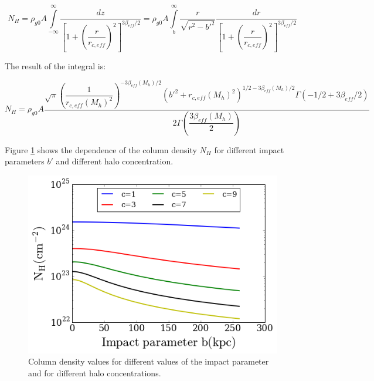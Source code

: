 \documentclass[12pt]{article}
\begin{document}
\begin{equation}
N_{H} = \rho_{g0}A \int \limits_{-\infty}^{\infty} \dfrac{dz}{\left
[ 1 + \left(\dfrac{r}{r_{c,eff}} \right)^2 \right]^{3\beta_{eff}/2}}
= \rho_{g0}A \int \limits_{b}^{\infty}\dfrac{r}{\sqrt{r^2 - b'^2}}\dfrac{dr}
{\left [ 1 + \left(\dfrac{r}{r_{c,eff}} \right)^2 \right]^{3\beta_{eff}/2}}
\end{equation}

The result of the integral is:

\begin{equation}\label{eq:NH}
N_{H} = \rho_{g0} A\dfrac{\sqrt{\pi} (\dfrac{1}{r_{c,eff}(M_h)^2})^{-3\beta_{eff}(M_h) /2} (b'^2 + r_{c,eff}(M_h)^2)^{1/2 - 3\beta_{eff}(M_h)/2} \Gamma(-1/2 + 3\beta_{eff}/2) }{2 \Gamma(\dfrac{3\beta_{eff}(M_h)}{2})}
\end{equation}


Figure \ref{fig:NHb} shows the dependence of the column density $N_H$
for different impact parameters $b'$ and different halo concentration.
\begin{figure}[H]
\centering
\includegraphics[scale=0.7]{../code/env/NH-b.png}
\caption{Column density values for different values of the impact
parameter and for different halo concentrations.\label{fig:NHb}}
\end{figure}


\end{document}
